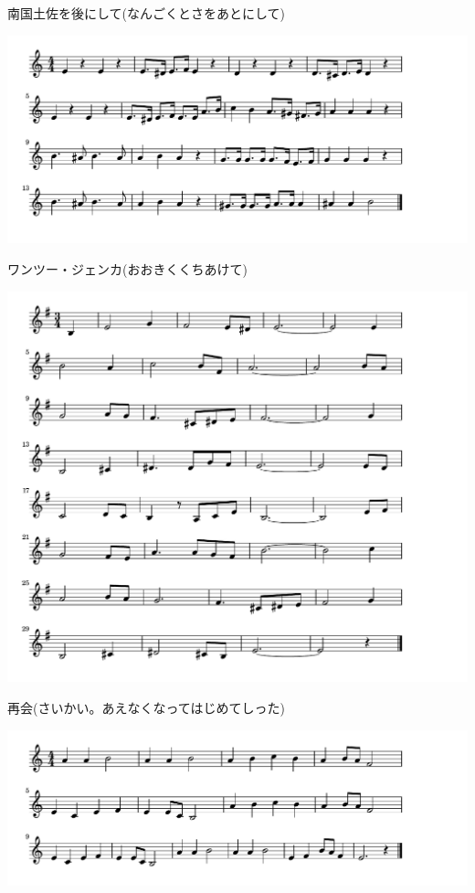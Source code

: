 \documentclass[a4paper]{ltjsarticle}
\begin{document}
\vspace{-10mm} \hspace{10mm}
南国土佐を後にして(なんごくとさをあとにして)





\includegraphics[clip]{onetwojenkka_crop.pdf}

\vspace{-10mm} \hspace{10mm}
ワンツー・ジェンカ(おおきくくちあけて)


\includegraphics[clip]{saikai_crop.pdf}

\vspace{-10mm} \hspace{10mm}
再会(さいかい。あえなくなってはじめてしった)



\includegraphics[clip]{sakura_crop.pdf}
\end{document}
